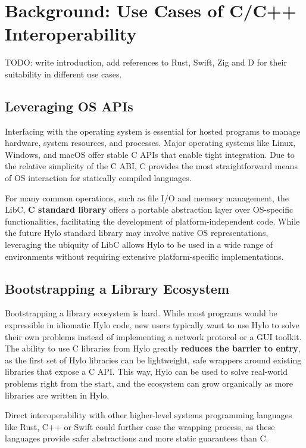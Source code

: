 \section {Background: Use Cases of C/C++ Interoperability}
TODO: write introduction, add references to Rust, Swift, Zig and D for their suitability in different use cases.

\subsection{Leveraging OS APIs}

Interfacing with the operating system is essential for hosted programs to manage hardware, system resources, and processes. Major operating systems like Linux, Windows, and macOS offer stable C APIs that enable tight integration. Due to the relative simplicity of the C ABI, C provides the most straightforward means of OS interaction for statically compiled languages.

For many common operations, such as file I/O and memory management, the LibC, \textbf{C standard library} \cite{libc} offers a portable abstraction layer over OS-specific functionalities, facilitating the development of platform-independent code. While the future Hylo standard library may involve native OS representations, leveraging the ubiquity of LibC allows Hylo to be used in a wide range of environments without requiring extensive platform-specific implementations.

\subsection{Bootstrapping a Library Ecosystem}
Bootstrapping a library ecosystem is hard. While most programs would be expressible in idiomatic Hylo code, new users typically want to use Hylo to solve their own problems instead of implementing a network protocol or a GUI toolkit. The ability to use C libraries from Hylo greatly \textbf{reduces the barrier to entry}, as the first set of Hylo libraries can be lightweight, safe wrappers around existing libraries that expose a C API. This way, Hylo can be used to solve real-world problems right from the start, and the ecosystem can grow organically as more libraries are written in Hylo.

Direct interoperability with other higher-level systems programming languages like Rust, C++ or Swift could further ease the wrapping process, as these languages provide safer abstractions and more static guarantees than C.

